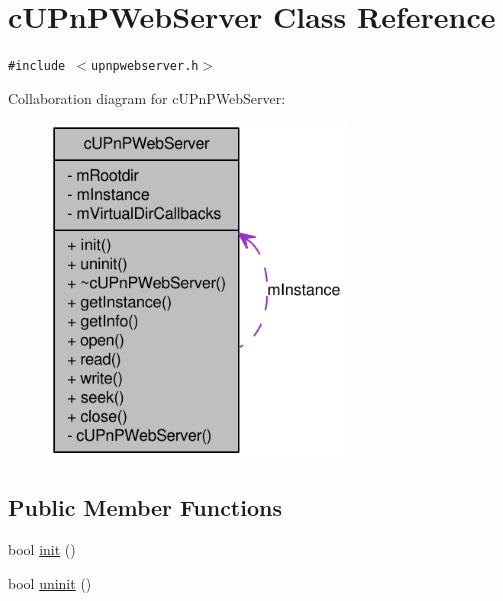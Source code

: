 \hypertarget{classcUPnPWebServer}{
\section{cUPnPWebServer Class Reference}
\label{classcUPnPWebServer}
}
{\tt \#include $<$upnpwebserver.h$>$}

Collaboration diagram for cUPnPWebServer:\nopagebreak
\begin{figure}[H]
\begin{center}
\leavevmode
\includegraphics[width=224pt]{classcUPnPWebServer__coll__graph}
\end{center}
\end{figure}
\subsection*{Public Member Functions}
\begin{CompactItemize}
\item 
bool \hyperlink{classcUPnPWebServer_a374ec8a84405fb2ee16dc00ba0218f5}{init} ()
\item 
bool \hyperlink{classcUPnPWebServer_cd20b60b929abfb205ec438127caed49}{uninit} ()
\end{CompactItemize}
